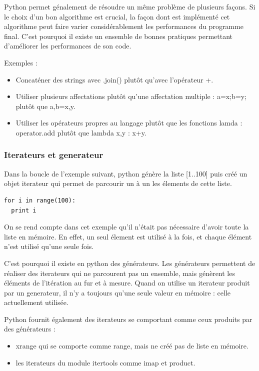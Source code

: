 \documentclass[a4paper]{article}
\begin{document}
Python permet génalement de résoudre un même problème de plusieurs façons. Si le choix d'un bon algorithme est crucial, la façon dont est implémenté cet algorithme peut faire varier considérablement les performances du programme final. C'est pourquoi il existe un ensemble de bonnes pratiques permettant d'améliorer les performances de son code\cite{PythonSpeed}. 


Exemples :
\begin{itemize}
\item Concaténer des strings avec .join() plutôt qu'avec l'opérateur +.
\item Utiliser plusieurs affectations plutôt qu'une affectation multiple : a=x;b=y; plutôt que a,b=x,y.
\item Utiliser les opérateurs propres au langage plutôt que les fonctions lamda : operator.add plutôt que lambda x,y : x+y.
\end{itemize}

\subsubsection{Iterateurs et generateur}

Dans la boucle de l'exemple suivant, python génère la liste  [1..100] puis créé un objet iterateur qui permet de parcourir un à un les élements de cette liste.

\begin{verbatim}
for i in range(100):
  print i
\end{verbatim}

On se rend compte dans cet exemple qu'il n'était pas nécessaire d'avoir toute la liste en mémoire. En effet, un seul élement est utilisé à la fois, et chaque élément n'est utilisé qu'une seule fois.

C'est pourquoi il existe en python des générateurs. Les générateurs permettent de réaliser des iterateurs qui ne parcourent pas un ensemble, mais génèrent les éléments de l'itération au fur et à mesure. Quand on utilise un iterateur produit par un generateur, il n'y a toujours qu'une seule valeur en mémoire : celle actuellement utilisée.

Python fournit également des iterateurs se comportant comme ceux produits par des générateurs : 

\begin{itemize}
  \item xrange qui se comporte comme range, mais ne créé pas de liste en mémoire.
  \item les iterateurs du module itertools comme imap et product.
\end{itemize}
\end{document}
